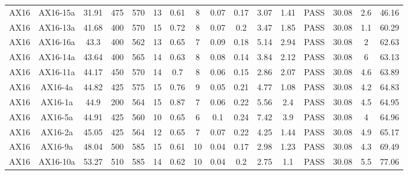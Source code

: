 \documentclass[9pt,twoside,lineno]{pnas-new}
\begin{document}
\begin{table}
\begin{tabular}{cccccccccccccccc}
AX16 & AX16-15a & 31.91     & 475       & 570       & 13 & 0.61 & 8     & 0.07    & 0.17    & 3.07           & 1.41            & PASS & 30.08         & 2.6      & 46.16         \\
AX16 & AX16-13a & 41.68     & 400       & 570       & 15 & 0.72 & 8     & 0.07    & 0.2     & 3.47           & 1.85            & PASS & 30.08         & 1.1      & 60.29         \\
AX16 & AX16-16a & 43.3      & 400       & 562       & 13 & 0.65 & 7     & 0.09    & 0.18    & 5.14           & 2.94            & PASS & 30.08         & 2        & 62.63         \\
AX16 & AX16-14a & 43.64     & 400       & 565       & 14 & 0.63 & 8     & 0.08    & 0.14    & 3.84           & 2.12            & PASS & 30.08         & 6        & 63.13         \\
AX16 & AX16-11a & 44.17     & 450       & 570       & 14 & 0.7  & 8     & 0.06    & 0.15    & 2.86           & 2.07            & PASS & 30.08         & 4.6      & 63.89         \\
AX16 & AX16-4a  & 44.82     & 425       & 575       & 15 & 0.76 & 9     & 0.05    & 0.21    & 4.77           & 1.08            & PASS & 30.08         & 4.2      & 64.83         \\
AX16 & AX16-1a  & 44.9      & 200       & 564       & 15 & 0.87 & 7     & 0.06    & 0.22    & 5.56           & 2.4             & PASS & 30.08         & 4.5      & 64.95         \\
AX16 & AX16-5a  & 44.91     & 425       & 560       & 10 & 0.65 & 6     & 0.1     & 0.24    & 7.42           & 3.9             & PASS & 30.08         & 4        & 64.96         \\
AX16 & AX16-2a  & 45.05     & 425       & 564       & 12 & 0.65 & 7     & 0.07    & 0.22    & 4.25           & 1.44            & PASS & 30.08         & 4.9      & 65.17         \\
AX16 & AX16-9a  & 48.04     & 500       & 585       & 15 & 0.61 & 10    & 0.04    & 0.17    & 2.98           & 1.23            & PASS & 30.08         & 4.3      & 69.49         \\
AX16 & AX16-10a & 53.27     & 510       & 585       & 14 & 0.62 & 10    & 0.04    & 0.2     & 2.75           & 1.1             & PASS & 30.08         & 5.5      & 77.06          \\
\hline
\end{tabular}
\label{tab:PINT_result}
\end{table}
\end{document}
